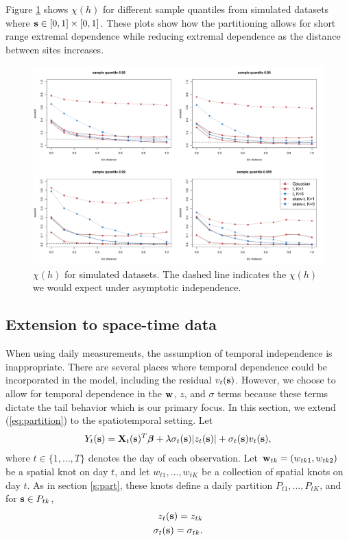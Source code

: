 \documentclass[11pt]{article}
\begin{document}
Figure \ref{fig:simchi} shows $\chi(h)$ for different sample quantiles from simulated datasets where $\mbox{\bf s} \in [0, 1] \times [0, 1]$.
These plots show how the partitioning allows for short range extremal dependence while reducing extremal dependence as the distance between sites increases.

\begin{figure}
  \includegraphics[width=\linewidth]{plots/sim-chi.pdf}
  \caption{$\chi(h)$ for simulated datasets. The dashed line indicates the $\chi(h)$ we would expect under asymptotic independence.}
  \label{fig:simchi}
\end{figure}

\subsection{Extension to space-time data} \label{s:temporal}
When using daily measurements, the assumption of temporal independence is inappropriate.
There are several places where temporal dependence could be incorporated in the model, including the residual $v_t(\mbox{\bf s})$.
However, we choose to allow for temporal dependence in the $\mbox{\bf w}$, $z$, and $\sigma$ terms because these terms dictate the tail behavior which is our primary focus.
In this section, we extend (\ref{eq:partition}) to the spatiotemporal setting.
Let
\begin{align*}
  Y_t(\mbox{\bf s}) = \mbox{\bf X}_t(\mbox{\bf s})^T \mbox{\boldmath $\beta$} + \lambda \sigma_t(\mbox{\bf s}) |z_t(\mbox{\bf s})| + \sigma_t(\mbox{\bf s}) v_t(\mbox{\bf s}),
\end{align*}
where $t \in \{1, \ldots, T\}$ denotes the day of each observation.
Let \hbox{$\mbox{\bf w}_{tk} = (w_{tk1}, w_{tk2})$} be a spatial knot on day $t$, and let $w_{t1}, \ldots, w_{tK}$ be a collection of spatial knots on day $t$.
As in section \ref{s:part}, these knots define a daily partition $P_{t1}, \ldots, P_{tK}$, and for $\mbox{\bf s} \in P_{tk}$,
\begin{align}
  z_t(\mbox{\bf s}) = z_{tk}\\
  \sigma_{t}(\mbox{\bf s}) = \sigma_{tk}.
\end{align}
\end{document}
